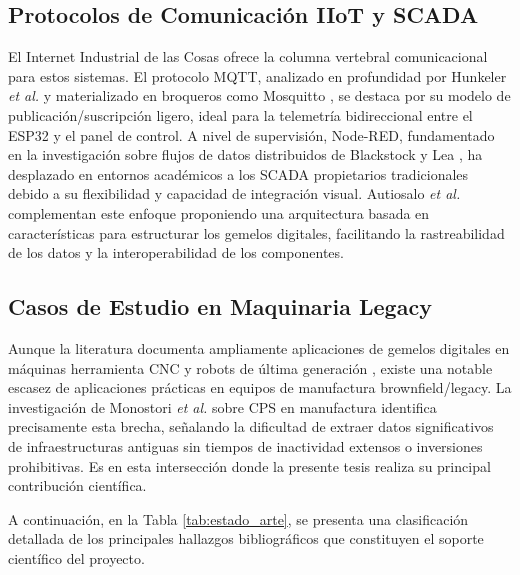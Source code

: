 \subsection*{Protocolos de Comunicación IIoT y SCADA}
El Internet Industrial de las Cosas ofrece la columna vertebral comunicacional para estos sistemas. El protocolo MQTT, analizado en profundidad por Hunkeler \textit{et al.} \cite{hunkeler2008} y materializado en broqueros como Mosquitto \cite{light2017}, se destaca por su modelo de publicación/suscripción ligero, ideal para la telemetría bidireccional entre el ESP32 y el panel de control. A nivel de supervisión, Node-RED, fundamentado en la investigación sobre flujos de datos distribuidos de Blackstock y Lea \cite{blackstock2014}, ha desplazado en entornos académicos a los SCADA propietarios tradicionales debido a su flexibilidad y capacidad de integración visual. Autiosalo \textit{et al.} \cite{autiosalo2020} complementan este enfoque proponiendo una arquitectura basada en características para estructurar los gemelos digitales, facilitando la rastreabilidad de los datos y la interoperabilidad de los componentes.

\subsection*{Casos de Estudio en Maquinaria Legacy}
Aunque la literatura documenta ampliamente aplicaciones de gemelos digitales en máquinas herramienta CNC y robots de última generación \cite{qi2018}, existe una notable escasez de aplicaciones prácticas en equipos de manufactura brownfield/legacy. La investigación de Monostori \textit{et al.} \cite{monostori2016} sobre CPS en manufactura identifica precisamente esta brecha, señalando la dificultad de extraer datos significativos de infraestructuras antiguas sin tiempos de inactividad extensos o inversiones prohibitivas. Es en esta intersección donde la presente tesis realiza su principal contribución científica.

A continuación, en la Tabla \ref{tab:estado_arte}, se presenta una clasificación detallada de los principales hallazgos bibliográficos que constituyen el soporte científico del proyecto.

